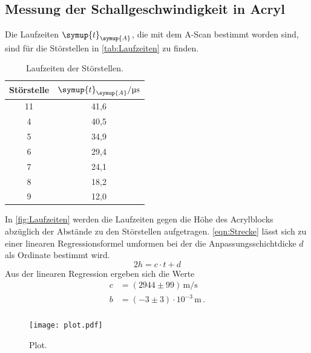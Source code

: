 \subsection{Messung der Schallgeschwindigkeit in Acryl}
\label{sec:SchallgeschwindigkeitAcryl}
Die Laufzeiten $\symup{t}_{\symup{A}}$, die mit dem A-Scan bestimmt worden sind, sind für die Störstellen in
\autoref{tab:Laufzeiten} zu finden.
\begin{table}
  \centering
  \begin{tabular}{c c}
    \toprule
    Störstelle & $\symup{t}_{\symup{A}}/\unit{\micro\second}$ \\
    \midrule
    11 & 41,6 \\
     4 & 40,5 \\
     5 & 34,9 \\
     6 & 29,4 \\
     7 & 24,1 \\
     8 & 18,2 \\
     9 & 12,0 \\
    \bottomrule
  \end{tabular}
  \caption{Laufzeiten der Störstellen.}
  \label{tab:Laufzeiten}
\end{table}
In \autoref{fig:Laufzeiten} werden die Laufzeiten gegen die Höhe des Acrylblocks abzüglich der Abstände zu den
Störstellen aufgetragen. \autoref{eqn:Strecke} lässt sich zu einer linearen Regressionsformel umformen bei der
die Anpassungsschichtdicke $d$ als Ordinate bestimmt wird.
\begin{equation*}
  2h = c\cdot t + d
\end{equation*} 
Aus der linearen Regression ergeben sich die Werte
\begin{align*}
  c &= (2944 \pm 99)\,\unit{\meter\per\second} \\
  b &= (-3 \pm 3)\cdot 10^{-3}\,\unit{\meter}\,. \\
\end{align*}

\begin{figure}
  \centering
  \texttt{[image: plot.pdf]}
  \caption{Plot.}
  \label{fig:Laufzeiten}
\end{figure}


